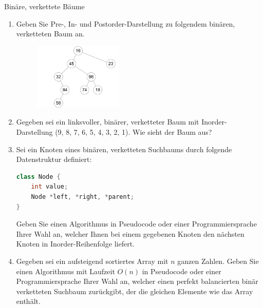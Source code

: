\documentclass[11pt,a4paper]{article}
\begin{document}
\begin{aufgabe}{5}{Binäre, verkettete Bäume}
    \begin{enumerate}
        \item Geben Sie Pre-, In- und Postorder-Darstellung zu folgendem binären, verketteten Baum an.
        \begin{figure}[h!]
            \centering
            \includegraphics[width=0.4\textwidth]{img/4a_neu}
        \end{figure}
        \FloatBarrier
        \item Gegeben sei ein linksvoller, binärer, verketteter Baum mit Inorder-Darstellung (9, 8, 7, 6, 5, 4, 3, 2, 1).
        Wie sieht der Baum aus?
        \item Sei ein Knoten eines binären, verketteten Suchbaums durch folgende Datenstruktur definiert:
        \begin{lstlisting}[language=c++]
class Node {
    int value;
    Node *left, *right, *parent;
} 
        \end{lstlisting}
        Geben Sie einen Algorithmus in Pseudocode oder einer Programmiersprache Ihrer Wahl an, welcher Ihnen bei einem gegebenen Knoten den nächsten Knoten in Inorder-Reihenfolge liefert.
        \item
        Gegeben sei ein aufsteigend sortiertes Array mit $n$ ganzen Zahlen.
        Geben Sie einen Algorithmus mit Laufzeit $O(n)$ in Pseudocode oder einer Programmiersprache Ihrer Wahl an, welcher einen perfekt balancierten binär verketteten Suchbaum zurückgibt, der die gleichen Elemente wie das Array enthält.
    \end{enumerate}
\end{aufgabe}
\end{document}
